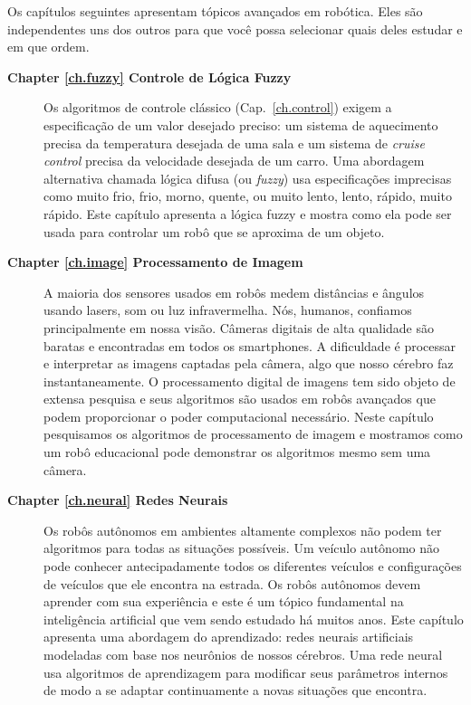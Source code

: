 Os capítulos seguintes apresentam tópicos avançados em robótica. Eles são independentes uns dos outros para que você possa selecionar quais deles estudar e em que ordem.
\begin{description}
\item [\textbf{Chapter \ref{ch.fuzzy} Controle de Lógica Fuzzy}] Os algoritmos de controle clássico (Cap.~\ref{ch.control}) exigem a especificação de um valor desejado preciso: um sistema de aquecimento precisa da temperatura desejada de uma sala e um sistema de \emph{cruise control} precisa da velocidade desejada de um carro. Uma abordagem alternativa chamada lógica difusa (ou \emph{fuzzy}) usa especificações imprecisas como muito frio, frio, morno, quente, ou muito lento, lento, rápido, muito rápido. Este capítulo apresenta a lógica fuzzy e mostra como ela pode ser usada para controlar um robô que se aproxima de um objeto.

\item [\textbf{Chapter \ref{ch.image} Processamento de Imagem}] A maioria dos sensores usados em robôs medem distâncias e ângulos usando lasers, som ou luz infravermelha. Nós, humanos, confiamos principalmente em nossa visão. Câmeras digitais de alta qualidade são baratas e encontradas em todos os smartphones. A dificuldade é processar e interpretar as imagens captadas pela câmera, algo que nosso cérebro faz instantaneamente. O processamento digital de imagens tem sido objeto de extensa pesquisa e seus algoritmos são usados em robôs avançados que podem proporcionar o poder computacional necessário. Neste capítulo pesquisamos os algoritmos de processamento de imagem e mostramos como um robô educacional pode demonstrar os algoritmos mesmo sem uma câmera.

\item [\textbf{Chapter \ref{ch.neural} Redes Neurais}] Os robôs autônomos em ambientes altamente complexos não podem ter algoritmos para todas as situações possíveis. Um veículo autônomo não pode conhecer antecipadamente todos os diferentes veículos e configurações de veículos que ele encontra na estrada. Os robôs autônomos devem aprender com sua experiência e este é um tópico fundamental na inteligência artificial que vem sendo estudado há muitos anos. Este capítulo apresenta uma abordagem do aprendizado: redes neurais artificiais modeladas com base nos neurônios de nossos cérebros. Uma rede neural usa algoritmos de aprendizagem para modificar seus parâmetros internos de modo a se adaptar continuamente a novas situações que encontra.


\end{description}
